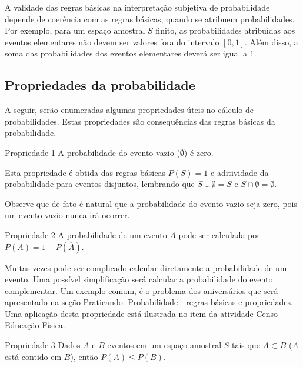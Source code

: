 A validade das regras básicas na interpretação subjetiva de probabilidade depende de coerência com as regras básicas, quando se atribuem probabilidades. Por exemplo, para um espaço amostral \(S\) finito, as probabilidades atribuídas aos eventos elementares não devem ser valores fora do intervalo \([0,1]\). Além disso, a soma das probabilidades dos eventos elementares deverá ser igual a $1$.


\subsection{Propriedades da probabilidade}

A seguir, serão enumeradas algumas propriedades úteis no cálculo de probabilidades. Estas propriedades são consequências das regras básicas da probabilidade.

\begin{observationtitle}{Propriedade 1}
A probabilidade do evento vazio (\(\emptyset\)) é zero.
\end{observationtitle}

Esta propriedade é obtida das regras básicas \(P(S)=1\) e aditividade da probabilidade para eventos disjuntos, lembrando que \(S\cup \emptyset =S\) e \(S\cap \emptyset =\emptyset\).

Observe que de fato é natural que a probabilidade do evento vazio seja zero, pois um evento vazio nunca irá ocorrer.

\begin{observationtitle}{Propriedade 2} A probabilidade de um evento \(A\) pode ser calculada por \(P({A})= 1-P(\overline{A})\).
\end{observationtitle}

Muitas vezes pode ser complicado calcular diretamente a probabilidade de um evento. Uma possível simplificação será calcular a probabilidade do evento complementar. Um exemplo comum, é o problema dos aniversários que será apresentado na seção \hyperref[regrasbasicaspropriedades]{Praticando: Probabilidade - regras básicas e propriedades}. Uma aplicação desta propriedade está ilustrada no item  da atividade \hyperref[censo-educacao-fisica]{Censo Educação Física}.

\begin{observationtitle}{Propriedade 3} Dados \(A\) e \(B\) eventos em um espaço amostral \(S\) tais que \(A\subset B\) (\(A\) está contido em \(B\)), então \(P(A)\leq P(B)\).
\end{observationtitle}

